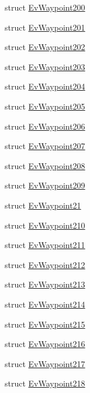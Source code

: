 \begin{DoxyCompactItemize}
\item 
struct \hyperlink{structmove__base__z__client_1_1EvWaypoint200}{Ev\+Waypoint200}
\item 
struct \hyperlink{structmove__base__z__client_1_1EvWaypoint201}{Ev\+Waypoint201}
\item 
struct \hyperlink{structmove__base__z__client_1_1EvWaypoint202}{Ev\+Waypoint202}
\item 
struct \hyperlink{structmove__base__z__client_1_1EvWaypoint203}{Ev\+Waypoint203}
\item 
struct \hyperlink{structmove__base__z__client_1_1EvWaypoint204}{Ev\+Waypoint204}
\item 
struct \hyperlink{structmove__base__z__client_1_1EvWaypoint205}{Ev\+Waypoint205}
\item 
struct \hyperlink{structmove__base__z__client_1_1EvWaypoint206}{Ev\+Waypoint206}
\item 
struct \hyperlink{structmove__base__z__client_1_1EvWaypoint207}{Ev\+Waypoint207}
\item 
struct \hyperlink{structmove__base__z__client_1_1EvWaypoint208}{Ev\+Waypoint208}
\item 
struct \hyperlink{structmove__base__z__client_1_1EvWaypoint209}{Ev\+Waypoint209}
\item 
struct \hyperlink{structmove__base__z__client_1_1EvWaypoint21}{Ev\+Waypoint21}
\item 
struct \hyperlink{structmove__base__z__client_1_1EvWaypoint210}{Ev\+Waypoint210}
\item 
struct \hyperlink{structmove__base__z__client_1_1EvWaypoint211}{Ev\+Waypoint211}
\item 
struct \hyperlink{structmove__base__z__client_1_1EvWaypoint212}{Ev\+Waypoint212}
\item 
struct \hyperlink{structmove__base__z__client_1_1EvWaypoint213}{Ev\+Waypoint213}
\item 
struct \hyperlink{structmove__base__z__client_1_1EvWaypoint214}{Ev\+Waypoint214}
\item 
struct \hyperlink{structmove__base__z__client_1_1EvWaypoint215}{Ev\+Waypoint215}
\item 
struct \hyperlink{structmove__base__z__client_1_1EvWaypoint216}{Ev\+Waypoint216}
\item 
struct \hyperlink{structmove__base__z__client_1_1EvWaypoint217}{Ev\+Waypoint217}
\item 
struct \hyperlink{structmove__base__z__client_1_1EvWaypoint218}{Ev\+Waypoint218}
\item 

\end{DoxyCompactItemize}
